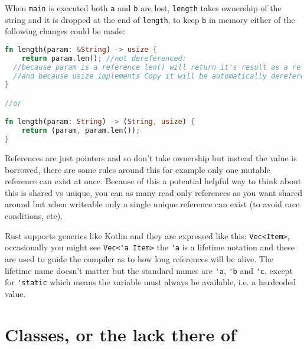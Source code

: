 \documentclass[a4paper,11pt]{article}
\begin{document}
When \lstinline{main} is executed both \lstinline{a} and \lstinline{b} are lost, \lstinline{length} takes ownership of the string and it is dropped at the end of \lstinline{length}, to keep \lstinline{b} in memory either of the following changes could be made:
\begin{lstlisting}[language=Rust,frame=single]
fn length(param: &String) -> usize {
	return param.len(); //not dereferenced:
  //because param is a reference len() will return it's result as a reference
  //and because usize implements Copy it will be automatically dereferenced
}

//or

fn length(param: String) -> (String, usize) {
	return (param, param.len()); 
}
\end{lstlisting}

References are just pointers and so don't take ownership but instead the value is borrowed, there are some rules around this for example only one mutable reference can exist at once. Because of this a potential helpful way to think about this is shared vs unique, you can as many read only references as you want shared around but when writeable only a single unique reference can exist (to avoid race conditions, etc).

Rust supports generics like Kotlin and they are expressed like this: \lstinline{Vec<Item>}, occasionally you might see \lstinline{Vec<'a Item>} the \lstinline{'a} is a lifetime notation and these are used to guide the compiler as to how long references will be alive. The lifetime name doesn't matter but the standard names are \lstinline{'a}, \lstinline{'b} and \lstinline{'c}, except for \lstinline{'static} which means the variable must always be available, i.e. a hardcoded value.

\newpage
\section{Classes, or the lack there of}
\end{document}
